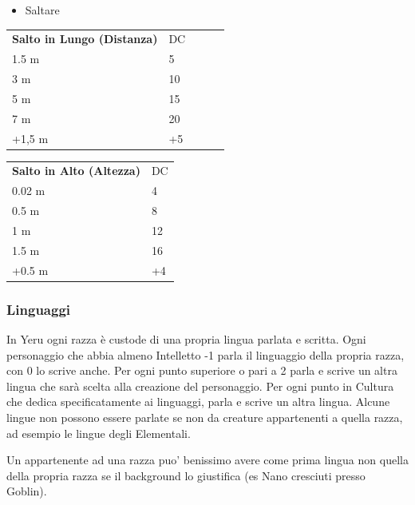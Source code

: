 \documentclass[a4paper,11pt,twoside,openany]{book}
\begin{document}
\begin{itemize}
	\item Saltare
\end{itemize}


\begin{tabular}{lllll}
	\cmidrule(l){1-2}
	\textbf{Salto in Lungo (Distanza)} & DC\\
	1.5 m                              & 5\\
	3 m                                & 10\\
	5 m                                & 15\\
	7 m                                & 20\\
	+1,5 m                             & +5\\
\end{tabular}
\bigskip


\begin{tabular}{ll}
	\toprule
	\textbf{	Salto in Alto (Altezza)} & DC\\
	0.02 m                           & 4\\
	0.5 m                            & 8\\
	1 m                              & 12\\
	1.5 m                            & 16\\
	+0.5 m                           & +4\\
\end{tabular}

\bigskip

\subsubsection{Linguaggi}

\label{linguaggi}

In Yeru ogni razza è custode di una propria lingua parlata e scritta. Ogni personaggio che abbia almeno Intelletto -1 parla il linguaggio della propria razza, con 0 lo scrive anche.
Per ogni punto superiore o pari a 2 parla e scrive un altra lingua che sarà scelta alla creazione del personaggio.
Per ogni punto in Cultura che dedica specificatamente ai linguaggi, parla e scrive un altra lingua. Alcune lingue non possono essere parlate se non da creature appartenenti a quella razza, ad esempio le lingue degli Elementali.

Un appartenente ad una razza puo' benissimo avere come prima lingua non quella della propria razza se il background lo giustifica (es Nano cresciuti presso Goblin).
\end{document}
